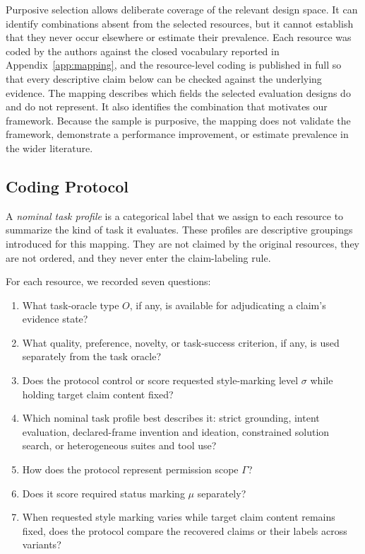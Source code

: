 \documentclass{clv2025}
\begin{document}
Purposive selection allows deliberate coverage of the relevant design space.
It can identify combinations absent from the selected resources, but it cannot
establish that they never occur elsewhere or estimate their prevalence.
Each resource was coded by the authors against the closed vocabulary reported
in Appendix~\ref{app:mapping}, and the resource-level coding is published in
full so that every descriptive claim below can be checked against the
underlying evidence.
The mapping describes which fields the selected evaluation designs do and do
not represent. It also identifies the combination that motivates our framework.
Because the sample is purposive, the mapping does not validate the framework,
demonstrate a performance improvement, or estimate prevalence in the wider
literature.

\subsection{Coding Protocol}

A \emph{nominal task profile} is a categorical label that we assign to each
resource to summarize the kind of task it evaluates.
These profiles are descriptive groupings introduced for this mapping.
They are not claimed by the original resources, they are not ordered, and they
never enter the claim-labeling rule.

For each resource, we recorded seven questions:
\begin{enumerate}
  \item What task-oracle type $O$, if any, is available for adjudicating a
        claim's evidence state?
  \item What quality, preference, novelty, or task-success criterion, if any,
        is used separately from the task oracle?
  \item Does the protocol control or score requested style-marking level
        $\sigma$ while holding target claim content fixed?
  \item Which nominal task profile best describes it: strict grounding, intent
        evaluation, declared-frame invention and ideation, constrained solution
        search, or heterogeneous suites and tool use?
  \item How does the protocol represent permission scope $\Gamma$?
  \item Does it score required status marking $\mu$ separately?
  \item When requested style marking varies while target claim content remains
        fixed, does the protocol compare the recovered claims or their labels
        across variants?
\end{enumerate}
\end{document}
